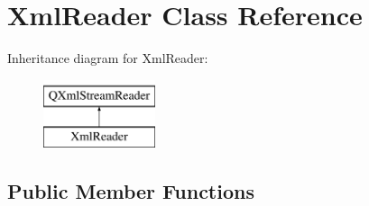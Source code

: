 \hypertarget{class_xml_reader}{}\section{Xml\+Reader Class Reference}
\label{class_xml_reader}
Inheritance diagram for Xml\+Reader\+:\begin{figure}[H]
\begin{center}
\leavevmode
\includegraphics[height=2.000000cm]{class_xml_reader}
\end{center}
\end{figure}
\subsection*{Public Member Functions}
